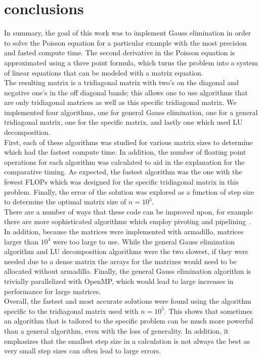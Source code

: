 \documentclass[prc,amsmath,twocolumn,superscriptaddress]{revtex4}
\begin{document}
\section{conclusions}
\label{conc}
In summary, the goal of this work was to implement Gauss elimination in order to solve the Poisson equation for a particular example with the most precision and fasted compute time. The second derivative in the Poisson equation is approximated using a three point formula, which turns the problem into a system of linear equations that can be modeled with a matrix equation. \\

The resulting matrix is a tridiagonal matrix with two's on the diagonal and negative one's in the off diagonal bands; this allows one to use algorithms that are only tridiagonal matrices as well as this specific tridiagonal matrix. We implemented four algorithms, one for general Gauss elimination, one for a general tridiagonal matrix, one for the specific matrix, and lastly one which used LU decomposition. \\

First, each of these algorithms was studied for various matrix sizes to determine which had the fastest compute time. In addition, the number of floating point operations for each algorithm was calculated to aid in the explanation for the comparative timing. As expected, the fastest algorithm was the one with the fewest FLOPs which was designed for the specific tridiagonal matrix in this problem. Finally, the error of the solution was explored as a function of step size to determine the optimal matrix size of $n=10^5$. \\

There are a number of ways that these code can be improved upon, for example there are more sophisticated algorithms which employ pivoting and pipelining~\cite{other_gauss,gauss_other2}. In addition, because the matrices were implemented with armadillo, matrices larger than $10^4$ were too large to use. While the general Gauss elimination algorithm and LU decomposition algorithms were the two slowest, if they were needed due to a dense matrix the arrays for the matrixes would need to be allocated without armadillo. Finally, the general Gauss elimination algorithm is trivially parallelized with OpenMP, which would lead to large increases in performance for large matrices. \\

Overall, the fastest and most accurate solutions were found using the algorithm specific to the tridiagonal matrix used with $n=10^5$. This shows that sometimes an algorithm that is tailored to the specific problem can be much more powerful than a general algorithm, even with the loss of generality. In addition, it emphasizes that the smallest step size in a calculation is not always the best as very small step sizes can often lead to large errors.


\end{document}
